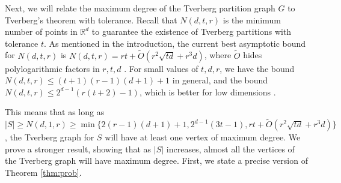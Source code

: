 \documentclass[11pt,a4paper]{article}
\theoremstyle{plain}
\theoremstyle{definition}
\newcommand{\rr}{\mathds{R}}
\begin{document}



Next, we will relate the maximum degree of the Tverberg partition graph $G$ to Tverberg's theorem with tolerance.  Recall that $N(d,t,r)$ is the minimum number of points in $\rr^d$ to guarantee the existence of Tverberg partitions with tolerance $t$.  As mentioned in the introduction, the current best asymptotic bound for $N(d,t,r)$ is $N(d,t,r) = rt + \tilde{O}(r^2\sqrt{td}+ r^3d)$, where $\tilde{O}$ hides polylogarithmic factors in $r,t,d$ \cite{Soberon:2018gn}.  For small values of $t,d,r$, we have the bound $N(d,t,r)\le (t+1)(r-1)(d+1) + 1$ in general, and the bound $N(d,t,r) \leq 2^{d-1}(r(t+2)-1)$, which is better for low dimensions \cite{Soberon:2012er, mulzer2014algorithms}.

This means that as long as $|S| \ge N(d,1,r) \ge \min \{ 2(r-1)(d+1)+1, 2^{d-1}(3t-1), rt + \tilde{O}(r^2\sqrt{td}+ r^3d)\}$, the Tverberg graph for $S$ will have at least one vertex of maximum degree.  We prove a stronger result, showing that as $|S|$ increases, almost all the vertices of the Tverberg graph will have maximum degree.  First, we state a precise version of Theorem \ref{thm:prob}.
\end{document}
